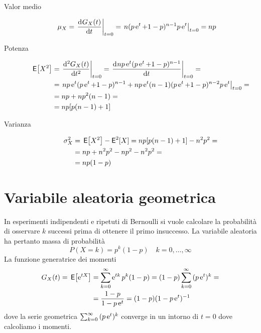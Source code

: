 \begin{description}
\item[Valor medio]
\begin{equation}\begin{split}
\mu_X&=\restrict{\deriv{G_X(t)}{t}}{t=0}=\restrict{n(p\e{t}+1-p)^{n-1}p\e{t}}{t=0}=n p\end{split}\end{equation}
\item[Potenza]
\begin{equation}\begin{split}
\E{X^2}&=\restrict{\deriv[2]{G_X(t)}{t}}{t=0}=\restrict{\deriv{np\e{t}(p\e{t}+1-p)^{n-1}}{t}}{t=0}=\\
&=\restrict{np\e{t}(p\e{t}+1-p)^{n-1}+np\e{t}(n-1)(p\e{t}+1-p)^{n-2}p\e{t}}{t=0}=\\
&=np+np^2(n-1)=\\
&=np[p(n-1)+1]
\end{split}\end{equation}
\item[Varianza]
\begin{equation}\begin{split}
\sigma^2_X&=\E{X^2}-\Esp^2[X]=np[p(n-1)+1]-n^2p^2=\\
&=np+n^2p^2-np^2-n^2p^2=\\
&=np(1-p)\end{split}
\end{equation}
\end{description}

\section{Variabile aleatoria geometrica}
In esperimenti indipendenti e ripetuti di Bernoulli si vuole calcolare la probabilità di osservare $k$ successi prima di ottenere il primo insuccesso. La variabile aleatoria  ha pertanto massa di probabilità
\begin{equation}
P(X=k)=p^k(1-p)\quad k=0,\dots,\infty
\end{equation}
La funzione generatrice dei momenti
\[\begin{split}G_X(t)=\E{\e{t X}}&=\sum_{k=0}^{\infty}{\e{t k}p^k(1-p)}=(1-p)\sum_{k=0}^{\infty}{(p\e{t})^k}=\\
&=\frac{1-p}{1-p\e{t}}=(1-p)(1-p\e{t})^{-1}\end{split}\]
dove la serie geometrica $\sum_{k=0}^{\infty}{(p\e{t})^k}$ converge in un intorno di $t=0$ dove calcoliamo i momenti.

